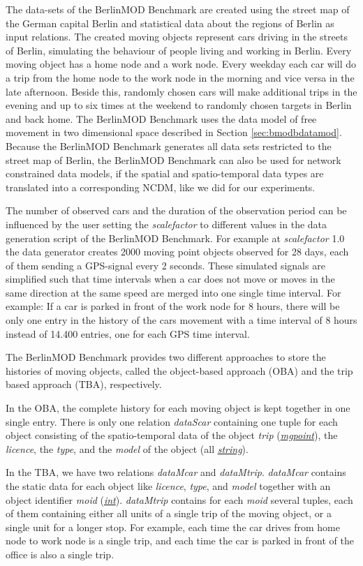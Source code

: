 \documentclass[a4paper]{article}
\newcommand{\bmodb} {BerlinMOD Benchmark}
\newcommand{\dt}[1]{\textsl{\underline{#1}}}
\begin{document}
The data-sets of the \bmodb{} are created using the street map of the German
capital Berlin \cite{bbike} and statistical data about the regions of Berlin
\cite{bevberlin,berlinstadtatlas} as input relations.
The created moving objects represent cars driving in the streets of Berlin,
simulating the behaviour of people living and working in Berlin.
Every moving object has a home node and a work node. Every weekday each car will
do a trip from the home node to the work node in the morning and vice versa
in the late afternoon. Beside this, randomly chosen cars will make additional
trips in the evening and up to six times at the weekend to randomly chosen
targets in Berlin and back home. The \bmodb{} uses the data model of free
movement in two dimensional space described in Section \ref{sec:bmodbdatamod}.
Because the \bmodb{} generates all data sets restricted to the street map of
Berlin, the \bmodb{} can also be used for network constrained data models, if
the spatial and spatio-temporal data types are translated into a corresponding
NCDM, like we did for our experiments.

The number of observed cars and the duration of the observation period can be
influenced by the user setting the \textit{scalefactor} to different values in
the data
generation script of the \bmodb{}. For example at \textit{scalefactor} 1.0 the
data
generator creates 2000 moving point objects observed for 28 days, each of them
sending a GPS-signal every 2 seconds. These simulated signals are simplified
such that time intervals when a car does not move or moves in the same direction
at the same speed are merged into one single time interval. For example: If a
car is parked in front of the work node for 8 hours, there will be only one
entry in the history of the cars movement with a time interval of 8 hours
instead of 14.400 entries, one for each GPS time interval.

The \bmodb{} provides two different approaches to store the histories of moving
objects, called the object-based approach (OBA) and the trip based approach
(TBA),
respectively.

In the OBA, the complete history for each moving object is kept together in one
single entry. There is only one relation \textit{dataScar}
containing one tuple for each object consisting of the spatio-temporal data of
the object \textit{trip} (\dt{mgpoint}), the \textit{licence}, the \textit{type}, and the \textit{model}
of the object (all \dt{string}).

In the TBA, we have two relations \textit{dataMcar} and \textit{dataMtrip}.
\textit{dataMcar} contains
the static data for each object like \textit{licence}, \textit{type}, and \textit{model} together
with an object identifier \textit{moid} (\dt{int}). \textit{dataMtrip} contains for
each \textit{moid} several tuples, each of them containing either all units of a single
trip of the moving object, or a single unit for a longer stop. For example, each
time the car drives from home node to work node is a single trip, and each time
the car is parked in front of the office is also a single trip.
\end{document}
